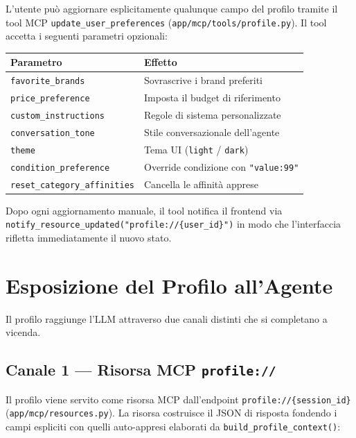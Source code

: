 L'utente può aggiornare esplicitamente qualunque campo del profilo
tramite il tool MCP \texttt{update\_user\_preferences}
(\texttt{app/mcp/tools/profile.py}). Il tool accetta i seguenti
parametri opzionali:

\begin{center}
\begin{tabular}{lp{8cm}}
\hline
\textbf{Parametro} & \textbf{Effetto} \\
\hline
\texttt{favorite\_brands}           & Sovrascrive i brand preferiti \\
\texttt{price\_preference}          & Imposta il budget di riferimento \\
\texttt{custom\_instructions}       & Regole di sistema personalizzate \\
\texttt{conversation\_tone}         & Stile conversazionale dell'agente \\
\texttt{theme}                      & Tema UI (\texttt{light} / \texttt{dark}) \\
\texttt{condition\_preference}      & Override condizione con \texttt{"value:99"} \\
\texttt{reset\_category\_affinities} & Cancella le affinità apprese \\
\hline
\end{tabular}
\end{center}

Dopo ogni aggiornamento manuale, il tool notifica il frontend via
\texttt{notify\_resource\_updated("profile://\{user\_id\}")} in modo
che l'interfaccia rifletta immediatamente il nuovo stato.


\section{Esposizione del Profilo all'Agente}
\label{sec:profile-exposure}

Il profilo raggiunge l'LLM attraverso due canali distinti che si
completano a vicenda.

\subsection{Canale 1 — Risorsa MCP \texttt{profile://}}
\label{subsec:mcp-resource-channel}

Il profilo viene servito come risorsa MCP dall'endpoint
\texttt{profile://\{session\_id\}} (\texttt{app/mcp/resources.py}).
La risorsa costruisce il JSON di risposta fondendo i campi espliciti
con quelli auto-appresi elaborati da \texttt{build\_profile\_context()}:

